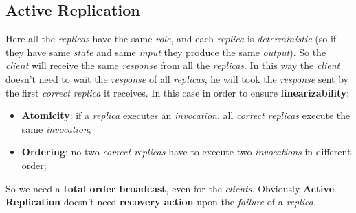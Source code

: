 \documentclass{article}
\begin{document}
\subsection{Active Replication}
Here all the \emph{replicas} have the same \emph{role}, and each \emph{replica} is \emph{deterministic} (so if they have same \emph{state} and same \emph{input} they produce the same \emph{output}). So the \emph{client} will receive the same \emph{response} from all the \emph{replicas}. In this way the \emph{client} doesn't need to wait the \emph{response} of all \emph{replicas}, he will took the \emph{response} sent by the first \emph{correct replica} it receives. In this case in order to ensure \textbf{linearizability}:
\begin{itemize}
\item \textbf{Atomicity}: if a \emph{replica} executes an \emph{invocation}, all \emph{correct replicas} execute the same \emph{invocation};
\item \textbf{Ordering}: no two \emph{correct replicas} have to execute two \emph{invocations} in different order;
\end{itemize}
So we need a \textbf{total order broadcast}, even for the \emph{clients}. Obviously \textbf{Active Replication} doesn't need \textbf{recovery action} upon the \emph{failure} of a \emph{replica}. 
\end{document}
